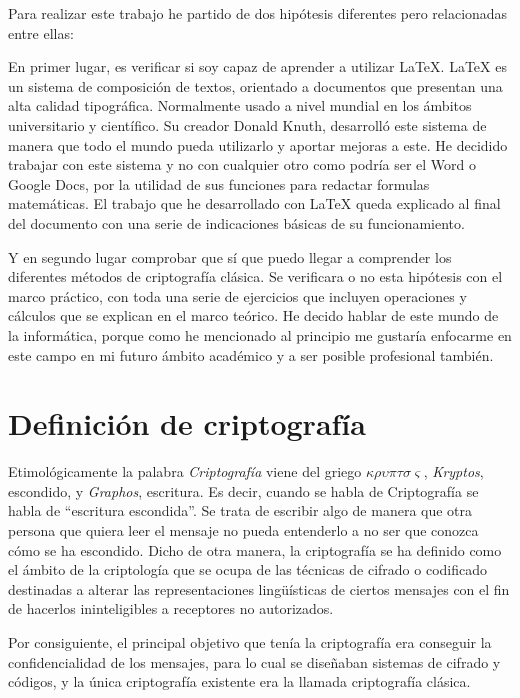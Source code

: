 \documentclass{article}
\begin{document}
Para realizar este trabajo he partido de dos hipótesis diferentes pero relacionadas entre ellas:

En primer lugar, es verificar si soy capaz de aprender a utilizar \LaTeX. \LaTeX \; es un sistema de composición de textos, orientado a documentos que presentan una alta calidad tipográfica. Normalmente usado a nivel mundial en los ámbitos universitario y científico. Su creador Donald Knuth, desarrolló este sistema de manera que todo el mundo pueda utilizarlo y aportar mejoras a este. He decidido trabajar con este sistema y no con cualquier otro como podría ser el Word o Google Docs, por la utilidad de sus funciones para redactar formulas matemáticas. El trabajo que he desarrollado con \LaTeX \; queda explicado al final del documento con una serie de indicaciones básicas de su funcionamiento.

Y en segundo lugar comprobar que sí que puedo llegar a comprender los diferentes métodos de criptografía clásica. Se verificara o no esta hipótesis con el marco práctico, con toda una serie de ejercicios que incluyen operaciones y cálculos que se explican en el marco teórico. He decido hablar de este mundo de la informática, porque como he mencionado al principio me gustaría enfocarme en este campo en mi futuro ámbito académico y a ser posible profesional también.

\newpage

\section{Definición de criptografía}
\justify
Etimológicamente la palabra \emph{Criptografía} viene del griego $\kappa \rho \upsilon \pi \tau \sigma \varsigma$, \emph{Kryptos}, escondido, y \emph{Graphos}, escritura. Es decir, cuando se habla de Criptografía se habla de ``escritura escondida''. Se trata de escribir algo de manera que otra persona que quiera leer el mensaje no pueda entenderlo a no ser que conozca cómo se ha escondido. Dicho de otra manera, la criptografía se ha definido como el ámbito de la criptología que se ocupa de las técnicas de cifrado o codificado destinadas a alterar las representaciones lingüísticas de ciertos mensajes con el fin de hacerlos ininteligibles a receptores no autorizados. 

Por consiguiente, el principal objetivo que tenía la criptografía era conseguir la confidencialidad de los mensajes, para lo cual se diseñaban sistemas de cifrado y códigos, y la única criptografía existente era la llamada criptografía clásica. 
\end{document}
